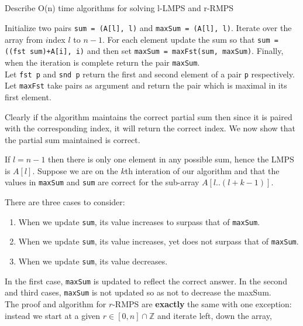 \documentclass{amsart}
\theoremstyle{definition}
\theoremstyle{remark}
\numberwithin{equation}{section}
\newcommand{\ZZ}{\mathbb Z}
\begin{document}
\subsection{} Describe O(n) time algorithms for solving l-LMPS and r-RMPS


Initialize two pairs \texttt{sum = (A[l], l)} and \texttt{maxSum = (A[l], l)}. Iterate over
the array from $i$ndex $l$ to $n-1$. For each element update the sum so that
\texttt{sum = ((fst\ sum)+A[i], i)} and then set \texttt{maxSum = maxFst(sum, maxSum)}. Finally,
when the iteration is complete return the pair \texttt{maxSum}. \\

\rmk
Let \texttt{fst p} and \texttt{snd p} return the first and second element of a pair \texttt{p} respectively.
Let \texttt{maxFst} take pairs as argument and return the pair which is maximal in its first element.

\proof
Clearly if the algorithm maintains the correct partial sum then since it is paired with
the corresponding index, it will return the correct index. We now show that the partial sum
maintained is correct.

If $l=n-1$ then there is only one element in any possible sum, hence the
LMPS is $A[l]$. Suppose we are on the $k$th interation of our algorithm
and that the values in \texttt{maxSum} and \texttt{sum} are correct for
the sub-array $A[l..(l+k-1)]$.

There are three cases to consider:

\begin{enumerate}
  \item When we update \texttt{sum}, its value increases to surpass that of \texttt{maxSum}.
  \item When we update \texttt{sum}, its value increases, yet does not surpass that of \texttt{maxSum}.
  \item When we update \texttt{sum}, its value decreases.
\end{enumerate}

In the first case, \texttt{maxSum} is updated to reflect the correct answer.
In the second and third cases, \texttt{maxSum} is not updated so as not to decrease the maxSum. \\

The proof and algorithm for $r$-RMPS are \textbf{exactly} the same with one exception: instead
we start at a given $r \in [0,n] \cap \ZZ$ and iterate left, down the array,
\end{document}

